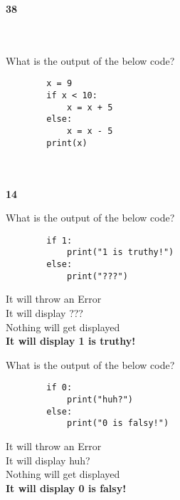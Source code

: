 \documentclass{exam}
\begin{document}
\begin{questions}
    \begin{oneparchoices}
        \choice \textbf{38} \\
         \\
         \\
    \end{oneparchoices}

    \question What is the output of the below code?

    \begin{verbatim}
        x = 9
        if x < 10:
            x = x + 5
        else:
            x = x - 5
        print(x)
    \end{verbatim}

    \begin{oneparchoices}
         \\
         \\
        \choice \textbf{14} \\
    \end{oneparchoices}

    \question What is the output of the below code?

    \begin{verbatim}
        if 1:
            print("1 is truthy!")
        else:
            print("???")
    \end{verbatim}

    \begin{oneparchoices}
        \choice It will throw an Error \\
        \choice It will display ??? \\
        \choice Nothing will get displayed \\
        \choice \textbf{It will display 1 is truthy!}
    \end{oneparchoices}

    \question What is the output of the below code?

    \begin{verbatim}
        if 0:
            print("huh?")
        else:
            print("0 is falsy!")
    \end{verbatim}

    \begin{oneparchoices}
        \choice It will throw an Error \\
        \choice It will display huh? \\
        \choice Nothing will get displayed \\
        \choice \textbf{It will display 0 is falsy!}
    \end{oneparchoices}


\end{questions}
\end{document}
